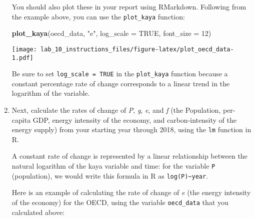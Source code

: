\documentclass[
]{article}
\newenvironment{Shaded}{\begin{snugshade}}{\end{snugshade}}
\newcommand{\CommentTok}[1]{\textcolor[rgb]{0.56,0.35,0.01}{\textit{#1}}}
\newcommand{\DataTypeTok}[1]{\textcolor[rgb]{0.13,0.29,0.53}{#1}}
\newcommand{\DecValTok}[1]{\textcolor[rgb]{0.00,0.00,0.81}{#1}}
\newcommand{\KeywordTok}[1]{\textcolor[rgb]{0.13,0.29,0.53}{\textbf{#1}}}
\newcommand{\NormalTok}[1]{#1}
\newcommand{\OperatorTok}[1]{\textcolor[rgb]{0.81,0.36,0.00}{\textbf{#1}}}
\newcommand{\OtherTok}[1]{\textcolor[rgb]{0.56,0.35,0.01}{#1}}
\newcommand{\StringTok}[1]{\textcolor[rgb]{0.31,0.60,0.02}{#1}}
\begin{document}
\begin{enumerate}
  You should also plot these in your report using RMarkdown. Following
  from the example above, you can use the \texttt{plot\_kaya} function:

\begin{Shaded}
\begin{Highlighting}[]
\KeywordTok{plot_kaya}\NormalTok{(oecd_data, }\StringTok{"e"}\NormalTok{, }\DataTypeTok{log_scale =} \OtherTok{TRUE}\NormalTok{, }\DataTypeTok{font_size =} \DecValTok{12}\NormalTok{)}
\end{Highlighting}
\end{Shaded}

  \texttt{[image: lab\_10\_instructions\_files/figure-latex/plot\_oecd\_data-1.pdf]}

  Be sure to set \texttt{log\_scale\ =\ TRUE} in the \texttt{plot\_kaya}
  function because a constant percentage rate of change corresponds to a
  linear trend in the logarithm of the variable.
\item
  Next, calculate the rates of change of \emph{P}, \emph{g}, \emph{e},
  and \emph{f} (the Population, per-capita GDP, energy intensity of the
  economy, and carbon-intensity of the energy supply) from your starting
  year through 2018, using the \texttt{lm} function in R.

  A constant rate of change is represented by a linear relationship
  between the natural logarithm of the kaya variable and time: for the
  variable \texttt{P} (population), we would write this formula in R as
  \texttt{log(P)\textasciitilde{}year}.

  Here is an example of calculating the rate of change of \emph{e} (the
  energy intensity of the economy) for the OECD, using the variable
  \texttt{oecd\_data} that you calculated above:

\begin{Shaded}
\end{Shaded}


\end{enumerate}
\end{document}
